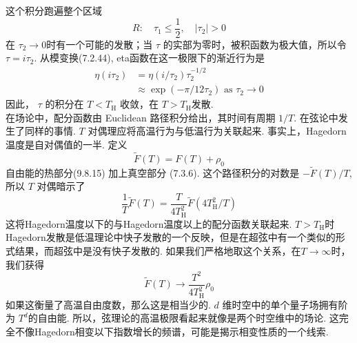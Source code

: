 这个积分跑遍整个区域
\begin{equation}
	R: \quad \tau_{1} \leq \frac{1}{2}, \quad\left|\tau_{2}\right|>0
\end{equation}
在 $\tau_{2} \rightarrow 0 $时有一个可能的发散；当 $\tau$ 的实部为零时，被积函数为极大值，所以令 $\tau=i \tau_{2}$. 从模变换(7.2.44),  eta函数在这一极限下的渐近行为是
\begin{equation}
	\begin{aligned}
		\eta\left(i \tau_{2}\right) &=\eta\left(i / \tau_{2}\right) \tau_{2}^{-1 / 2} \\
		& \approx \exp \left(-\pi / 12 \tau_{2}\right) \text { as } \tau_{2} \rightarrow 0
	\end{aligned}
\end{equation}
因此， $\tau$ 的积分在 $T<T_{\mathrm{H}}$ 收敛，在 $T>T_{\mathrm{H}}$发散.\\
在场论中，配分函数由 Euclidean 路径积分给出，其时间有周期 $1 / T$. 在弦论中发生了同样的事情. $T$ 对偶理应将高温行为与低温行为关联起来. 事实上，Hagedorn 温度是自对偶值的一半. 定义
\begin{equation}
	\tilde{F}(T)=F(T)+\rho_{0}
\end{equation}
自由能的热部分(9.8.15) 加上真空部分 (7.3.6). 这个路径积分的对数是 $-\tilde{F}(T) / T$, 所以 $T$ 对偶暗示了
\begin{equation}
	\frac{1}{T} \tilde{F}(T)=\frac{T}{4 T_{\mathrm{H}}^{2}} \tilde{F}\left(4 T_{\mathrm{H}}^{2} / T\right)
\end{equation}
这将Hagedorn温度以下的与Hagedorn温度以上的配分函数关联起来. $T>T_{\mathrm{H}}$时Hagedorn发散是低温理论中快子发散的一个反映，但是在超弦中有一个类似的形式结果，而超弦中是没有快子发散的. 如果我们严格地取这个关系，在$T \rightarrow \infty $时，我们获得
\begin{equation}
	\tilde{F}(T) \rightarrow \frac{T^{2}}{4 T_{\mathrm{H}}^{2}} \rho_{0}
\end{equation}
如果这衡量了高温自由度数，那么这是相当少的.  $d$ 维时空中的单个量子场拥有阶为 $T^{d}$的自由能. 所以，弦理论的高温极限看起来就像是两个时空维中的场论. 这完全不像Hagedorn相变以下指数增长的频谱，可能是揭示相变性质的一个线索.

